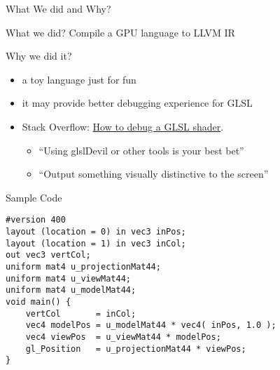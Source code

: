 \begin{frame}{What We did and Why?}
    \begin{block}{What we did?}
        Compile a GPU language to LLVM IR
    \end{block}

    \begin{block}{Why we did it?}
        \begin{itemize}
            \item a toy language just for fun
            \item it may provide better debugging experience for GLSL
            \item Stack Overflow: \href{https://stackoverflow.com/questions/2508818/how-to-debug-a-glsl-shader}{How to debug a GLSL shader}.
            \begin{itemize}
                \item ``Using glslDevil or other tools is your best bet''
                \item ``Output something visually distinctive to the screen''    
            \end{itemize}
        \end{itemize}
    \end{block}

\end{frame}

\begin{frame}[fragile]{Sample Code}
   \begin{lstlisting}
#version 400
layout (location = 0) in vec3 inPos;
layout (location = 1) in vec3 inCol;
out vec3 vertCol;
uniform mat4 u_projectionMat44;
uniform mat4 u_viewMat44;
uniform mat4 u_modelMat44;
void main() {
    vertCol       = inCol;
    vec4 modelPos = u_modelMat44 * vec4( inPos, 1.0 );
    vec4 viewPos  = u_viewMat44 * modelPos;
    gl_Position   = u_projectionMat44 * viewPos;
}
   \end{lstlisting}
\end{frame}
